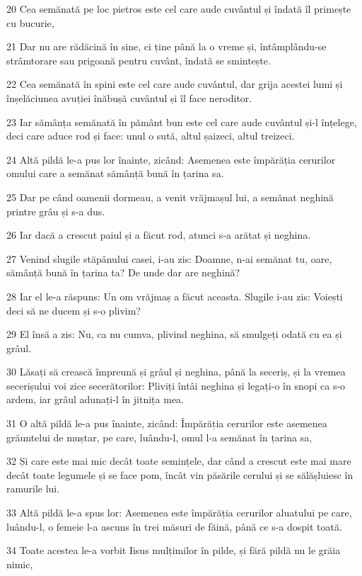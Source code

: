 \par 20 Cea semănată pe loc pietros este cel care aude cuvântul și îndată îl primește cu bucurie,
\par 21 Dar nu are rădăcină în sine, ci ține până la o vreme și, întâmplându-se strâmtorare sau prigoană pentru cuvânt, îndată se smintește.
\par 22 Cea semănată în spini este cel care aude cuvântul, dar grija acestei lumi și înșelăciunea avuției înăbușă cuvântul și îl face neroditor.
\par 23 Iar sămânța semănată în pământ bun este cel care aude cuvântul și-l înțelege, deci care aduce rod și face: unul o sută, altul șaizeci, altul treizeci.
\par 24 Altă pildă le-a pus lor înainte, zicând: Asemenea este împărăția cerurilor omului care a semănat sămânță bună în țarina sa.
\par 25 Dar pe când oamenii dormeau, a venit vrăjmașul lui, a semănat neghină printre grâu și s-a dus.
\par 26 Iar dacă a crescut paiul și a făcut rod, atunci s-a arătat și neghina.
\par 27 Venind slugile stăpânului casei, i-au zis: Doamne, n-ai semănat tu, oare, sămânță bună în țarina ta? De unde dar are neghină?
\par 28 Iar el le-a răspuns: Un om vrăjmaș a făcut aceasta. Slugile i-au zis: Voiești deci să ne ducem și s-o plivim?
\par 29 El însă a zis: Nu, ca nu cumva, plivind neghina, să smulgeți odată cu ea și grâul.
\par 30 Lăsați să crească împreună și grâul și neghina, până la seceriș, și la vremea secerișului voi zice secerătorilor: Pliviți întâi neghina și legați-o în snopi ca s-o ardem, iar grâul adunați-l în jitnița mea.
\par 31 O altă pildă le-a pus înainte, zicând: Împărăția cerurilor este asemenea grăuntelui de muștar, pe care, luându-l, omul l-a semănat în țarina sa,
\par 32 Și care este mai mic decât toate semințele, dar când a crescut este mai mare decât toate legumele și se face pom, încât vin păsările cerului și se sălășluiesc în ramurile lui.
\par 33 Altă pildă le-a spus lor: Asemenea este împărăția cerurilor aluatului pe care, luându-l, o femeie l-a ascuns în trei măsuri de făină, până ce s-a dospit toată.
\par 34 Toate acestea le-a vorbit Iisus mulțimilor în pilde, și fără pildă nu le grăia nimic,
